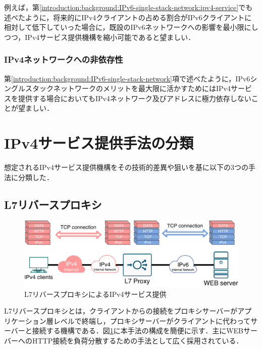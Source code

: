 例えば，第\ref{introduction:background:IPv6-single-stack-network:ipv4-service}でも述べたように，将来的にIPv4クライアントの占める割合がIPv6クライアントに相対して低下していった場合に，既設のIPv6ネットワークへの影響を最小限にしつつ，IPv4サービス提供機構を縮小可能であると望ましい．


\subsubsection{IPv4ネットワークへの非依存性}
第\ref{introduction:background:IPv6-single-stack-network}項で述べたように，IPv6シングルスタックネットワークのメリットを最大限に活かすためにはIPv4サービスを提供する場合においてもIPv4ネットワーク及びアドレスに極力依存しないことが望ましい．



\section{IPv4サービス提供手法の分類}
\label{related:compare}
想定されるIPv4サービス提供機構をその技術的差異や狙いを基に以下の3つの手法に分類した．

\subsection{L7リバースプロキシ}

\begin{figure}[h]
    \begin{center}
      \includegraphics[width=15cm,pagebox=cropbox,clip]{img/L7_proxy_model.pdf}
    \end{center}
    \caption{L7リバースプロキシによるIPv4サービス提供}
    \label{fig:L7_proxy_model}
\end{figure}


L7リバースプロキシとは，クライアントからの接続をプロキシサーバーがアプリケーション層レベルで終端し，プロキシサーバーがクライアントに代わってサーバーと接続する機構である\cite{Gilly2011}．図\ref{fig:L7_proxy_model}に本手法の構成を簡便に示す．主にWEBサーバーへのHTTP接続を負荷分散するための手法として広く採用されている．

